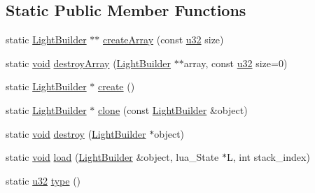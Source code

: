 \subsection*{Static Public Member Functions}
\begin{DoxyCompactItemize}
\item 
static \mbox{\hyperlink{classnjli_1_1_light_builder}{Light\+Builder}} $\ast$$\ast$ \mbox{\hyperlink{classnjli_1_1_light_builder_aab30733f1421b35630caaa0ac907dcb2}{create\+Array}} (const \mbox{\hyperlink{_util_8h_a10e94b422ef0c20dcdec20d31a1f5049}{u32}} size)
\item 
static \mbox{\hyperlink{_thread_8h_af1e856da2e658414cb2456cb6f7ebc66}{void}} \mbox{\hyperlink{classnjli_1_1_light_builder_ab16a1e8eed4eb47d0567fd04eb7545ca}{destroy\+Array}} (\mbox{\hyperlink{classnjli_1_1_light_builder}{Light\+Builder}} $\ast$$\ast$array, const \mbox{\hyperlink{_util_8h_a10e94b422ef0c20dcdec20d31a1f5049}{u32}} size=0)
\item 
static \mbox{\hyperlink{classnjli_1_1_light_builder}{Light\+Builder}} $\ast$ \mbox{\hyperlink{classnjli_1_1_light_builder_ab9c0ea3d00ad2542e86f67d49aa0143b}{create}} ()
\item 
static \mbox{\hyperlink{classnjli_1_1_light_builder}{Light\+Builder}} $\ast$ \mbox{\hyperlink{classnjli_1_1_light_builder_a48ee256578d1390ef6bec7627a30a4c6}{clone}} (const \mbox{\hyperlink{classnjli_1_1_light_builder}{Light\+Builder}} \&object)
\item 
static \mbox{\hyperlink{_thread_8h_af1e856da2e658414cb2456cb6f7ebc66}{void}} \mbox{\hyperlink{classnjli_1_1_light_builder_abf4ee2d41383010dcbad031b939e66ac}{destroy}} (\mbox{\hyperlink{classnjli_1_1_light_builder}{Light\+Builder}} $\ast$object)
\item 
static \mbox{\hyperlink{_thread_8h_af1e856da2e658414cb2456cb6f7ebc66}{void}} \mbox{\hyperlink{classnjli_1_1_light_builder_ad1e8c0f31d685a967232ea8be1f2e954}{load}} (\mbox{\hyperlink{classnjli_1_1_light_builder}{Light\+Builder}} \&object, lua\+\_\+\+State $\ast$L, int stack\+\_\+index)
\item 
static \mbox{\hyperlink{_util_8h_a10e94b422ef0c20dcdec20d31a1f5049}{u32}} \mbox{\hyperlink{classnjli_1_1_light_builder_ab116d38f46899e9ede12dd63a24a9096}{type}} ()
\end{DoxyCompactItemize}
